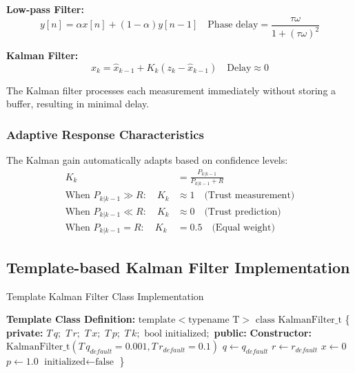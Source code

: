 \documentclass{article}
\begin{document}
\textbf{Low-pass Filter:}
\begin{equation}
y[n] = \alpha x[n] + (1-\alpha)y[n-1] \quad \text{Phase delay} = \frac{\tau \omega}{1+(\tau \omega)^2}
\end{equation}

\textbf{Kalman Filter:}
\begin{equation}
\hat{x}_k = \hat{x}_{k-1} + K_k(z_k - \hat{x}_{k-1}) \quad \text{Delay} \approx 0
\end{equation}

The Kalman filter processes each measurement immediately without storing a buffer, resulting in minimal delay.

\subsubsection{Adaptive Response Characteristics}

The Kalman gain automatically adapts based on confidence levels:
\begin{align}
K_k &= \frac{P_{k|k-1}}{P_{k|k-1} + R} \\
\text{When } P_{k|k-1} \gg R: \quad K_k &\approx 1 \quad \text{(Trust measurement)} \\
\text{When } P_{k|k-1} \ll R: \quad K_k &\approx 0 \quad \text{(Trust prediction)} \\
\text{When } P_{k|k-1} = R: \quad K_k &= 0.5 \quad \text{(Equal weight)}
\end{align}

\subsection{Template-based Kalman Filter Implementation}

\begin{algorithm}
\caption{Template Kalman Filter Class Implementation}
\label{alg:template_kalman}
\begin{algorithmic}[1]
\STATE \textbf{Template Class Definition:}
\STATE $\text{template}<\text{typename T}>$ 
\STATE $\text{class KalmanFilter\_t}$ \{
\STATE \quad \textbf{private:}
\STATE \quad \quad $T \, q;$ 
\STATE \quad \quad $T \, r;$ 
\STATE \quad \quad $T \, x;$ 
\STATE \quad \quad $T \, p;$ 
\STATE \quad \quad $T \, k;$ 
\STATE \quad \quad $\text{bool initialized};$ 
\STATE
\STATE \quad \textbf{public:}
\STATE \quad \quad \textbf{Constructor:} $\text{KalmanFilter\_t}(T \, q_{default} = 0.001, T \, r_{default} = 0.1)$
\STATE \quad \quad \quad $q \leftarrow q_{default}$
\STATE \quad \quad \quad $r \leftarrow r_{default}$
\STATE \quad \quad \quad $x \leftarrow 0$
\STATE \quad \quad \quad $p \leftarrow 1.0$ 
\STATE \quad \quad \quad $\text{initialized} \leftarrow \text{false}$
\STATE \}
\end{algorithmic}
\end{algorithm}
\end{document}

